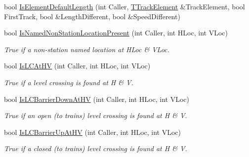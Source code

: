 \begin{DoxyCompactItemize}
bool \mbox{\hyperlink{class_t_track_a9519d6fa40b71bfcad4d5383634d73dd}{Is\+Element\+Default\+Length}} (int Caller, \mbox{\hyperlink{class_t_track_element}{T\+Track\+Element}} \&Track\+Element, bool First\+Track, bool \&Length\+Different, bool \&Speed\+Different)
\item 
\mbox{\label{class_t_track_a7867a4b41fbc25f35eccab0b03cab9ed}} 
bool \mbox{\hyperlink{class_t_track_a7867a4b41fbc25f35eccab0b03cab9ed}{Is\+Named\+Non\+Station\+Location\+Present}} (int Caller, int H\+Loc, int V\+Loc)
\begin{DoxyCompactList}\small\item\em True if a non-\/station named location at H\+Loc \& V\+Loc. \end{DoxyCompactList}\item 
\mbox{\label{class_t_track_a73e781d0ada0b77618b886557f79b115}} 
bool \mbox{\hyperlink{class_t_track_a73e781d0ada0b77618b886557f79b115}{Is\+L\+C\+At\+HV}} (int Caller, int H\+Loc, int V\+Loc)
\begin{DoxyCompactList}\small\item\em True if a level crossing is found at H \& V. \end{DoxyCompactList}\item 
\mbox{\label{class_t_track_aad258b17c96ace0dbbad3754eb743274}} 
bool \mbox{\hyperlink{class_t_track_aad258b17c96ace0dbbad3754eb743274}{Is\+L\+C\+Barrier\+Down\+At\+HV}} (int Caller, int H\+Loc, int V\+Loc)
\begin{DoxyCompactList}\small\item\em True if an open (to trains) level crossing is found at H \& V. \end{DoxyCompactList}\item 
\mbox{\label{class_t_track_a7331fe3693d4a1f2aa76817e66fba995}} 
bool \mbox{\hyperlink{class_t_track_a7331fe3693d4a1f2aa76817e66fba995}{Is\+L\+C\+Barrier\+Up\+At\+HV}} (int Caller, int H\+Loc, int V\+Loc)
\begin{DoxyCompactList}\small\item\em True if a closed (to trains) level crossing is found at H \& V. \end{DoxyCompactList}\item 
\mbox{\label{class_t_track_a96468affb70f97173d882afefbec9fb2}} 

\end{DoxyCompactItemize}
